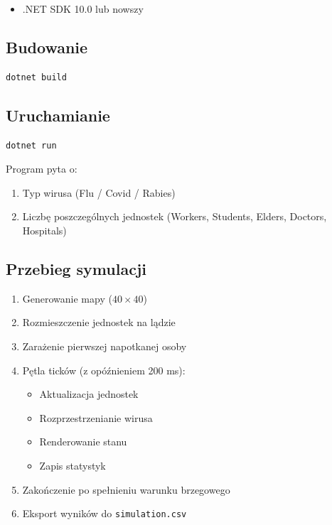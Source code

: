 \documentclass[a4paper,12pt]{article}
\begin{document}
\begin{itemize}
    \item .NET SDK 10.0 lub nowszy
\end{itemize}

\subsection{Budowanie}

\begin{lstlisting}[frame=single, numbers=none, basicstyle=\ttfamily\small]
dotnet build
\end{lstlisting}

\subsection{Uruchamianie}

\begin{lstlisting}[frame=single, numbers=none, basicstyle=\ttfamily\small]
dotnet run
\end{lstlisting}

Program pyta o:
\begin{enumerate}
    \item Typ wirusa (Flu / Covid / Rabies)
    \item Liczbę poszczególnych jednostek (Workers, Students, Elders, Doctors, Hospitals)
\end{enumerate}

\subsection{Przebieg symulacji}

\begin{enumerate}
    \item Generowanie mapy ($40 \times 40$)
    \item Rozmieszczenie jednostek na lądzie
    \item Zarażenie pierwszej napotkanej osoby
    \item Pętla ticków (z opóźnieniem 200 ms):
          \begin{itemize}
              \item Aktualizacja jednostek
              \item Rozprzestrzenianie wirusa
              \item Renderowanie stanu
              \item Zapis statystyk
          \end{itemize}
    \item Zakończenie po spełnieniu warunku brzegowego
    \item Eksport wyników do \texttt{simulation.csv}
\end{enumerate}
\end{document}

